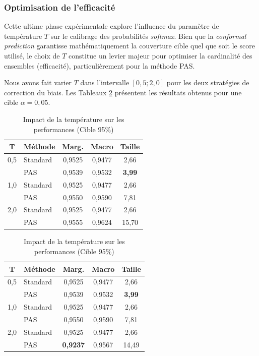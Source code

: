 \documentclass[12pt,a4paper]{article}
\begin{document}
\subsubsection{Optimisation de l'efficacité}

Cette ultime phase expérimentale explore l'influence du paramètre de température $T$ sur le calibrage des probabilités \textit{softmax}. Bien que la \textit{conformal prediction} garantisse mathématiquement la couverture cible quel que soit le score utilisé, le choix de $T$ constitue un levier majeur pour optimiser la cardinalité des ensembles (efficacité), particulièrement pour la méthode PAS.

Nous avons fait varier $T$ dans l'intervalle $[0,5 ; 2,0]$ pour les deux stratégies de correction du biais. Les Tableaux \ref{tab:temp_comparison} présentent les résultats obtenus pour une cible $\alpha = 0,05$.

\begin{table}[H]
\centering
\caption{Impact de la température sur les performances (Cible 95\%)}
\label{tab:temp_comparison}

\begin{minipage}{0.48\textwidth}
    \centering
    \begin{tabular}{|c|l|c|c|c|}
    \hline
    \textbf{T} & \textbf{Méthode} & \textbf{Marg.} & \textbf{Macro} & \textbf{Taille} \\
    \hline
    0,5 & Standard & 0,9525 & 0,9477 & 2,66 \\
        & PAS      & 0,9539 & 0,9532 & \textbf{3,99} \\
    \hline
    1,0 & Standard & 0,9525 & 0,9477 & 2,66 \\
        & PAS      & 0,9550 & 0,9590 & 7,81 \\
    \hline
    2,0 & Standard & 0,9525 & 0,9477 & 2,66 \\
        & PAS      & 0,9555 & 0,9624 & 15,70 \\
    \hline
    \end{tabular}
\end{minipage}
\hfill
\begin{minipage}{0.48\textwidth}
    \centering
    \begin{tabular}{|c|l|c|c|c|}
    \hline
    \textbf{T} & \textbf{Méthode} & \textbf{Marg.} & \textbf{Macro} & \textbf{Taille} \\
    \hline
    0,5 & Standard & 0,9525 & 0,9477 & 2,66 \\
        & PAS      & 0,9539 & 0,9532 & \textbf{3,99} \\
    \hline
    1,0 & Standard & 0,9525 & 0,9477 & 2,66 \\
        & PAS      & 0,9550 & 0,9590 & 7,81 \\
    \hline
    2,0 & Standard & 0,9525 & 0,9477 & 2,66 \\
        & PAS      & \textbf{0,9237} & 0,9567 & 14,49 \\
    \hline
    \end{tabular}
\end{minipage}
\end{table}
\end{document}
